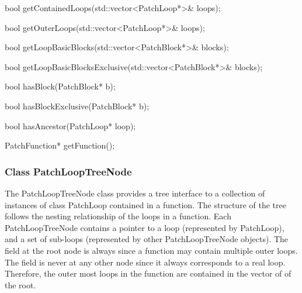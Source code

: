 \begin{apient}
bool getContainedLoops(std::vector<PatchLoop*>& loops);
\end{apient}

\begin{apient}
bool getOuterLoops(std::vector<PatchLoop*>& loops);
\end{apient}


\begin{apient}
bool getLoopBasicBlocks(std::vector<PatchBlock*>& blocks);
\end{apient}


\begin{apient}
bool getLoopBasicBlocksExclusive(std::vector<PatchBlock*>& blocks);
\end{apient}

\begin{apient}
bool hasBlock(PatchBlock* b);
\end{apient}

\begin{apient}
bool hasBlockExclusive(PatchBlock* b);
\end{apient}

\begin{apient}
bool hasAncestor(PatchLoop* loop);
\end{apient}

\begin{apient}
PatchFunction* getFunction();
\end{apient}

\subsubsection{Class PatchLoopTreeNode}
\label{sec:patchlooptreenode}


The PatchLoopTreeNode class provides a tree interface to a collection of instances of class
PatchLoop contained in a function. The structure of the tree
follows the nesting relationship of the loops in a function.
Each PatchLoopTreeNode contains a pointer to a loop (represented by PatchLoop), and a set
of sub-loops (represented by other PatchLoopTreeNode objects). The  field
at the root node is always  since a function may contain multiple outer
loops. The  field is never  at any other node since it
always corresponds to a real loop.
Therefore, the outer most loops in the function are contained in the vector of  of the root.


